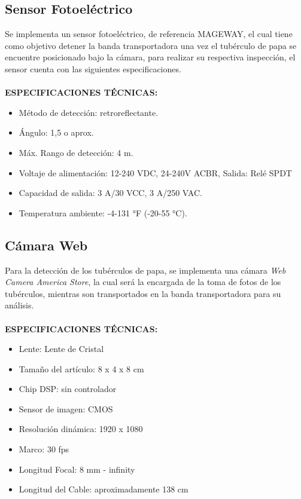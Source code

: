 		\subsection{Sensor Fotoeléctrico}
			Se implementa un sensor fotoeléctrico, de referencia MAGEWAY, el cual tiene como objetivo detener la banda transportadora una vez el tubérculo de papa se encuentre posicionado bajo la cámara, para realizar su respectiva inspección, el sensor cuenta con las siguientes especificaciones.
			\\
			\\
			\textbf{ESPECIFICACIONES TÉCNICAS:}
				\begin{itemize}
					\item Método de detección: retroreflectante.
					\item Ángulo: 1,5 o aprox.
					\item Máx. Rango de detección: 4 m.
					\item Voltaje de alimentación: 12-240 VDC, 24-240V ACBR, Salida: Relé SPDT
					\item Capacidad de salida: 3 A/30 VCC, 3 A/250 VAC.
					\item Temperatura ambiente: -4-131 °F (-20-55 °C).
				\end{itemize}
\newpage			
		\subsection{Cámara Web}
			Para la detección de los tubérculos de papa, se implementa una cámara \textit{Web Camera America Store}, la cual será la encargada de la toma de fotos de los tubérculos, mientras son transportados en la banda transportadora para su análisis.
			\\
			\\
			\textbf{ESPECIFICACIONES TÉCNICAS:}
			\begin{itemize}
				\item Lente: Lente de Cristal
				\item Tamaño del artículo: 8 x 4 x 8 cm
				\item Chip DSP: sin controlador
				\item Sensor de imagen: CMOS
				\item Resolución dinámica: 1920 x 1080
				\item Marco: 30 fps
				\item Longitud Focal: 8 mm - infinity
				\item Longitud del Cable: aproximadamente 138 cm
			\end{itemize}
			
